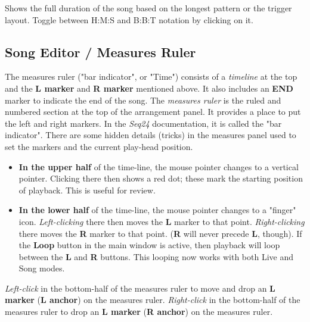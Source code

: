    Shows the full duration of the song based on the longest pattern or
   the trigger layout.
   Toggle between H:M:S and B:B:T notation by clicking on it.

\subsection{Song Editor / Measures Ruler}
\label{subsec:song_editor_measures_ruler}

   The measures ruler ("bar indicator", or "Time")
   consists of a \textsl{timeline} at the top and the 
   \textbf{L marker} and \textbf{R marker} mentioned above.
   It also includes an \textbf{END} marker to indicate the
   end of the song.
   The \textsl{measures ruler} is the ruled and numbered section at the top
   of the arrangement panel.  It provides a place to put the left and right
   markers.  In the \textsl{Seq24} documentation, it is called the "bar
   indicator".
   There are some hidden details (tricks) in the measures panel used to
   set the markers and the current play-head position.

   \begin{itemize}
      \item \textbf{In the upper half} of the time-line,
         the mouse pointer changes to a vertical pointer.
         Clicking there then shows a red dot; these mark
         the starting position of playback.
         This is useful for review.
      \item \textbf{In the lower half} of the time-line,
         the mouse pointer changes to a "finger" icon.
         \textsl{Left-clicking} there then moves the \textbf{L}
         marker to that point.
         \textsl{Right-clicking} there moves the \textbf{R} marker to that point.
         (\textbf{R} will never precede \textbf{L}, though).
         If the \textbf{Loop} button in the main window is active, then
         playback will loop between the \textbf{L} and \textbf{R} buttons.
         This looping now works with both Live and Song modes.
   \end{itemize}

   \textsl{Left-click} in the bottom-half of the
   measures ruler to move and drop an
   \textbf{L marker} (\textbf{L anchor}) on the measures ruler.
   \textsl{Right-click} in the bottom-half of the measures ruler to drop an
   \textbf{L marker} (\textbf{R anchor}) on the measures ruler.
   
